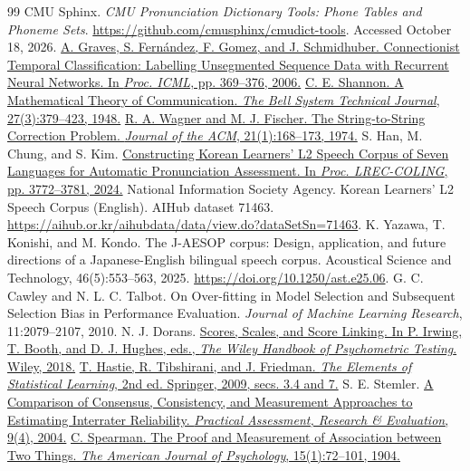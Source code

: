 \documentclass[cameraready]{Interspeech}
\begin{document}
\begin{thebibliography}{99}
 CMU Sphinx. \textit{CMU Pronunciation Dictionary Tools: Phone Tables and Phoneme Sets}. \url{https://github.com/cmusphinx/cmudict-tools}. Accessed October 18, 2026.
 \href{https://doi.org/10.1145/1143844.1143891}{A. Graves, S. Fern\'andez, F. Gomez, and J. Schmidhuber. Connectionist Temporal Classification: Labelling Unsegmented Sequence Data with Recurrent Neural Networks. In \textit{Proc. ICML}, pp. 369--376, 2006.}
 \href{https://doi.org/10.1002/j.1538-7305.1948.tb01338.x}{C. E. Shannon. A Mathematical Theory of Communication. \textit{The Bell System Technical Journal}, 27(3):379--423, 1948.}
 \href{https://doi.org/10.1145/321796.321811}{R. A. Wagner and M. J. Fischer. The String-to-String Correction Problem. \textit{Journal of the ACM}, 21(1):168--173, 1974.}
 S. Han, M. Chung, and S. Kim. \href{https://aclanthology.org/2024.lrec-main.334/}{Constructing Korean Learners' L2 Speech Corpus of Seven Languages for Automatic Pronunciation Assessment. In \textit{Proc. LREC-COLING}, pp. 3772--3781, 2024.}
 National Information Society Agency. Korean Learners' L2 Speech Corpus (English). AIHub dataset 71463. \url{https://aihub.or.kr/aihubdata/data/view.do?dataSetSn=71463}.
 K. Yazawa, T. Konishi, and M. Kondo. The J-AESOP corpus: Design, application, and future directions of a Japanese-English bilingual speech corpus. Acoustical Science and Technology, 46(5):553--563, 2025. \url{https://doi.org/10.1250/ast.e25.06}.
 G. C. Cawley and N. L. C. Talbot. On Over-fitting in Model Selection and Subsequent Selection Bias in Performance Evaluation. \textit{Journal of Machine Learning Research}, 11:2079--2107, 2010.
 N. J. Dorans. \href{https://doi.org/10.1002/9781118489772.ch19}{Scores, Scales, and Score Linking. In P. Irwing, T. Booth, and D. J. Hughes, eds., \textit{The Wiley Handbook of Psychometric Testing}. Wiley, 2018.}
 \href{https://doi.org/10.1007/978-0-387-84858-7}{T. Hastie, R. Tibshirani, and J. Friedman. \textit{The Elements of Statistical Learning}, 2nd ed. Springer, 2009, secs. 3.4 and 7.}
 S. E. Stemler. \href{https://doi.org/10.7275/zrjx-8p89}{A Comparison of Consensus, Consistency, and Measurement Approaches to Estimating Interrater Reliability. \textit{Practical Assessment, Research \& Evaluation}, 9(4), 2004.}
 \href{https://doi.org/10.2307/1412159}{C. Spearman. The Proof and Measurement of Association between Two Things. \textit{The American Journal of Psychology}, 15(1):72--101, 1904.}

\end{thebibliography}
\end{document}
